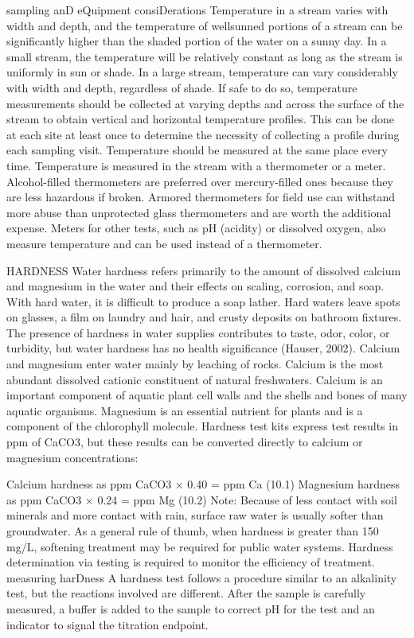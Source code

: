 \documentclass{article}
\begin{document}
sampling anD eQuipment consiDerations Temperature in a stream varies
with width and depth, and the temperature of wellsunned portions of a
stream can be significantly higher than the shaded portion of the water
on a sunny day. In a small stream, the temperature will be relatively
constant as long as the stream is uniformly in sun or shade. In a large
stream, temperature can vary considerably with width and depth,
regardless of shade. If safe to do so, temperature measurements should
be collected at varying depths and across the surface of the stream to
obtain vertical and horizontal temperature profiles. This can be done at
each site at least once to determine the necessity of collecting a
profile during each sampling visit. Temperature should be measured at
the same place every time. Temperature is measured in the stream with a
thermometer or a meter. Alcohol-filled thermometers are preferred over
mercury-filled ones because they are less hazardous if broken. Armored
thermometers for field use can withstand more abuse than unprotected
glass thermometers and are worth the additional expense. Meters for
other tests, such as pH (acidity) or dissolved oxygen, also measure
temperature and can be used instead of a thermometer.

HARDNESS Water hardness refers primarily to the amount of dissolved
calcium and magnesium in the water and their effects on scaling,
corrosion, and soap. With hard water, it is difficult to produce a soap
lather. Hard waters leave spots on glasses, a film on laundry and hair,
and crusty deposits on bathroom fixtures. The presence of hardness in
water supplies contributes to taste, odor, color, or turbidity, but
water hardness has no health significance (Hauser, 2002). Calcium and
magnesium enter water mainly by leaching of rocks. Calcium is the most
abundant dissolved cationic constituent of natural freshwaters. Calcium
is an important component of aquatic plant cell walls and the shells and
bones of many aquatic organisms. Magnesium is an essential nutrient for
plants and is a component of the chlorophyll molecule. Hardness test
kits express test results in ppm of CaCO3, but these results can be
converted directly to calcium or magnesium concentrations:

Calcium hardness as ppm CaCO3 × 0.40 = ppm Ca (10.1) Magnesium hardness
as ppm CaCO3 × 0.24 = ppm Mg (10.2) Note: Because of less contact with
soil minerals and more contact with rain, surface raw water is usually
softer than groundwater. As a general rule of thumb, when hardness is
greater than 150 mg/L, softening treatment may be required for public
water systems. Hardness determination via testing is required to monitor
the efficiency of treatment. measuring harDness A hardness test follows
a procedure similar to an alkalinity test, but the reactions involved
are different. After the sample is carefully measured, a buffer is added
to the sample to correct pH for the test and an indicator to signal the
titration endpoint.
\end{document}
